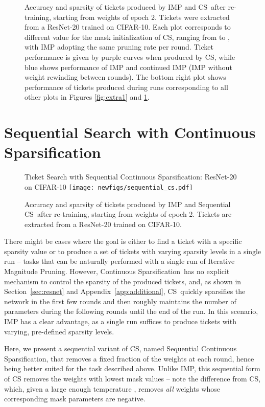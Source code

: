 \documentclass{article}
\newcommand{\method}{Continuous Sparsification}
\newcommand{\methodacro}{CS}
\begin{document}
\begin{figure}[H]
\caption{Accuracy and sparsity of tickets produced by IMP and \methodacro~after re-training, starting from weights of epoch 2. Tickets were extracted from a ResNet-20 trained on CIFAR-10. Each plot corresponds to different value for the mask initialization  of \methodacro, ranging from  to , with IMP adopting the same pruning rate per round. Ticket performance is given by purple curves when produced by \methodacro, while blue shows performance of IMP and continued IMP (IMP without weight rewinding between rounds). The bottom right plot shows performance of tickets produced during runs corresponding to all other plots in Figures \ref{fig:extra1} and \ref{fig:extra2}.}
\label{fig:extra2}
\end{figure}

\section{Sequential Search with \method}
\label{app:seqcs}

\begin{figure}[!t]
    \centering
    \footnotesize{\textsf{Ticket Search with Sequential \method: ResNet-20 on CIFAR-10}}
     \texttt{[image: newfigs/sequential\_cs.pdf]}
    \caption{Accuracy and sparsity of tickets produced by IMP and Sequential \methodacro~after re-training, starting from weights of epoch 2. Tickets are extracted from a ResNet-20 trained on CIFAR-10.}
    \label{fig:sequential}
\end{figure}

There might be cases where the goal is either to find a ticket with a specific sparsity value or to produce a set of tickets with varying sparsity levels in a single run -- tasks that can be naturally performed with a single run of Iterative Magnitude Pruning. However, \method~has no explicit mechanism to control the sparsity of the produced tickets, and, as shown in Section~\ref{sec:resnet} and Appendix~\ref{app:additional}, \methodacro~quickly sparsifies the network in the first few rounds and then roughly maintains the number of parameters during the following rounds until the end of the run. In this scenario, IMP has a clear advantage, as a single run suffices to produce tickets with varying, pre-defined sparsity levels.

Here, we present a sequential variant of \methodacro, named Sequential \method, that removes a fixed fraction of the weights at each round, hence being better suited for the task described above. Unlike IMP, this sequential form of CS removes the weights with lowest mask values  -- note the difference from \methodacro, which, given a large enough temperature , removes \emph{all} weights whose corresponding mask parameters are negative.
\end{document}
